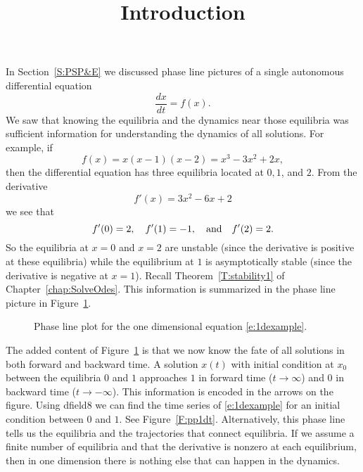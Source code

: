 \documentclass{ximera}
\title{Introduction}
\begin{document}
\begin{abstract}
\end{abstract}
\maketitle


\label{S:introAPNS}

In Section~\ref{S:PSP&E} we discussed phase line pictures of 
a single autonomous 
differential equation 
\[
\frac{dx}{dt} = f(x).
\]
We saw that knowing the equilibria and the dynamics 
near those equilibria was sufficient information for understanding 
the dynamics of all solutions.  For example, if 
\begin{equation}  \label{e:1dexample}
f(x) = x(x-1)(x-2)=x^3-3x^2+2x,
\end{equation}
then the differential equation has three equilibria located at 
$0,1$, and $2$.  From the derivative
\[
f'(x)=3x^2-6x+2
\]
we see that 
\[
f'(0)=2, \quad f'(1)=-1, \quad\mbox{and}\quad f'(2)=2.
\]
So the equilibria at $x=0$ and $x=2$ are unstable 
(since the derivative 
is positive at these equilibria) while the equilibrium at $1$ is 
asymptotically stable (since the derivative is negative at $x=1$). 
Recall Theorem~\ref{T:stability1} of Chapter~\ref{chap:SolveOdes}.  
This information is summarized in the phase line picture in 
Figure~\ref{F:pp1d}.

\begin{figure}[htb]
           \centerline{%
            }
           \caption{Phase line plot for the one dimensional equation
	\protect\eqref{e:1dexample}.}
           \label{F:pp1d}
\end{figure}

The added content of Figure~\ref{F:pp1d} is that we now know the 
fate of all solutions in both forward and backward time.  A 
solution $x(t)$ with initial condition at $x_0$ between the 
equilibria $0$ and $1$ approaches $1$ in forward time
($t\to\infty$) and $0$ in backward time ($t\to -\infty$).  
This information is 
encoded in the arrows on the figure.  Using {\sf dfield8}
 we can 
find the time series of \eqref{e:1dexample} for an initial condition 
between $0$ and $1$.  See Figure~\ref{F:pp1dt}. Alternatively, this  
phase line tells us the equilibria and the trajectories that connect 
equilibria.  If we assume a finite number of equilibria and that the
derivative is nonzero at each equilibrium, then in one dimension 
there is nothing else that can happen in the dynamics.
\end{document}
